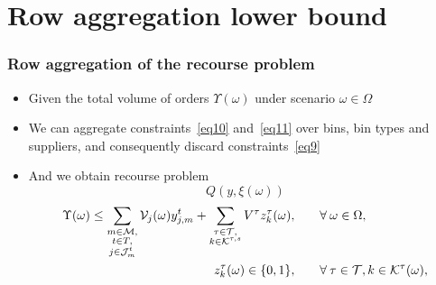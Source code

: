 \documentclass[9pt,xcolor={dvipsnames}]{beamer}
\begin{document}
\section{Row aggregation lower bound}
\begin{frame}%
	\frametitle{Row aggregation of the recourse problem}
	\begin{itemize}
		\item<1-> Given the total volume of orders $\Upsilon (\omega)$ under scenario $ \omega \in \Omega$
		\bigskip
		\item<2-> We can aggregate constraints~\eqref{eq10} and~\eqref{eq11} over bins, bin types and suppliers, and consequently discard constraints~\eqref{eq9}
		\bigskip
		\item<3-> And we obtain recourse problem
		{
			\small
			\begin{equation*}
				Q \left(y,\xi (\omega)\right)
			\end{equation*}
			\begin{alignat}{2}
				\Upsilon (\omega) \leq \sum\limits_{\substack{ m \in {\cal M}, \\ t \in T, \\ j \in {\cal J}^t_{m}}} {\cal V}_{j}(\omega) y_{j,m}^t + \sum\limits_{\substack{\tau \in {\cal T}, \\ k \in {\cal K}^{\tau,s}}} V^\tau z^{\tau}_k(\omega), & \qquad \forall \: \omega \in \Omega, \label{eq10lb}\\
				z_k^{\tau}(\omega) \in \{0, 1\}, & \qquad \forall \: \tau \in {\cal T}, k \in {\cal K}^{\tau}(\omega), \label{eq14lb}
			\end{alignat}
		}
	\end{itemize}
\end{frame}
\end{document}
